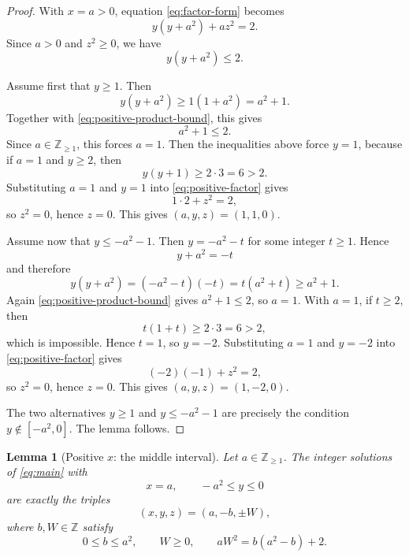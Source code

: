 \documentclass[11pt]{article}
\newtheorem{lemma}[theorem]{Lemma}
\theoremstyle{remark}
\newcommand{\Z}{\mathbb Z}
\newcommand{\Zpos}{\mathbb Z_{\ge 1}}
\begin{document}
\begin{proof}
With $x=a>0$, equation \eqref{eq:factor-form} becomes
\begin{equation}\label{eq:positive-factor}
        y(y+a^2)+az^2=2.
\end{equation}
Since $a>0$ and $z^2\ge 0$, we have
\begin{equation}\label{eq:positive-product-bound}
        y(y+a^2)\le 2.
\end{equation}

Assume first that $y\ge 1$.  Then
\[
        y(y+a^2)\ge 1(1+a^2)=a^2+1.
\]
Together with \eqref{eq:positive-product-bound}, this gives
\[
        a^2+1\le 2.
\]
Since $a\in\Zpos$, this forces $a=1$.  Then the inequalities above force $y=1$, because if $a=1$ and $y\ge 2$, then
\[
        y(y+1)\ge 2\cdot 3=6>2.
\]
Substituting $a=1$ and $y=1$ into \eqref{eq:positive-factor} gives
\[
        1\cdot 2+z^2=2,
\]
so $z^2=0$, hence $z=0$.  This gives $(a,y,z)=(1,1,0)$.

Assume now that $y\le -a^2-1$.  Then $y=-a^2-t$ for some integer $t\ge 1$.  Hence
\[
        y+a^2=-t
\]
and therefore
\[
        y(y+a^2)=(-a^2-t)(-t)=t(a^2+t)\ge a^2+1.
\]
Again \eqref{eq:positive-product-bound} gives $a^2+1\le 2$, so $a=1$.  With $a=1$, if $t\ge 2$, then
\[
        t(1+t)\ge 2\cdot 3=6>2,
\]
which is impossible.  Hence $t=1$, so $y=-2$.  Substituting $a=1$ and $y=-2$ into \eqref{eq:positive-factor} gives
\[
        (-2)(-1)+z^2=2,
\]
so $z^2=0$, hence $z=0$.  This gives $(a,y,z)=(1,-2,0)$.

The two alternatives $y\ge 1$ and $y\le -a^2-1$ are precisely the condition $y\notin[-a^2,0]$.  The lemma follows.
\end{proof}

\begin{lemma}[Positive $x$: the middle interval]\label{lem:positive-middle}
Let $a\in\Zpos$.  The integer solutions of \eqref{eq:main} with
\[
        x=a,
        \qquad -a^2\le y\le 0
\]
are exactly the triples
\[
        (x,y,z)=(a,-b,\pm W),
\]
where $b,W\in\Z$ satisfy
\[
        0\le b\le a^2,
        \qquad W\ge 0,
        \qquad aW^2=b(a^2-b)+2.
\]
\end{lemma}
\end{document}
